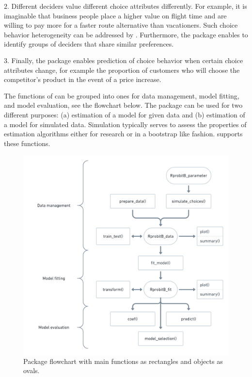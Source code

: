 \documentclass[article]{jss}
\begin{document}
2. Different deciders value different choice attributes differently. For example, it is imaginable that business people place a higher value on flight time and are willing to pay more for a faster route alternative than vacationers. Such choice behavior heterogeneity can be addressed by . Furthermore, the package enables to identify groups of deciders that share similar preferences.

3. Finally, the package enables prediction of choice behavior when certain choice attributes change, for example the proportion of customers who will choose the competitor's product in the event of a price increase.

The functions of  can be grouped into ones for data management, model fitting, and model evaluation, see the flowchart below. The package can be used for two different purposes: (a) estimation of a model for given data and (b) estimation of a model for simulated data. Simulation typically serves to assess the properties of estimation algorithms either for research or in a bootstrap like fashion.  supports these functions.

\begin{figure}[t!]
  \includegraphics{flowchart.png}
  \caption{Package flowchart with main functions as rectangles and objects as ovals.}
  \label{fig:flowchart}
\end{figure}
\end{document}
